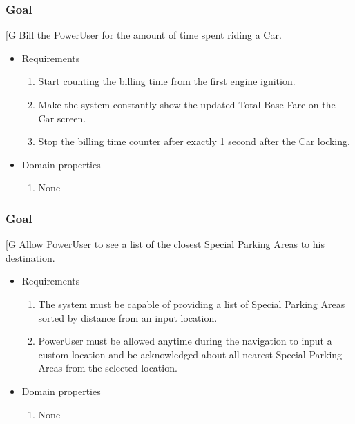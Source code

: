     \subsubsection{Goal }
    {[}G\arabic{goalctr}{]}
	Bill the PowerUser for the amount of time spent riding a Car.
    \begin{itemize}
        \item Requirements
        \begin{enumerate}[REQ]
                \item Start counting the billing time from the first engine ignition.
    	        \item Make the system constantly show the updated Total Base Fare on the Car screen.
    	        \item Stop the billing time counter after exactly 1 second after the Car locking.
        \end{enumerate}
        \item Domain properties
        \begin{enumerate}[PRO]
                \item None
        \end{enumerate}
    \end{itemize}

    \subsubsection{Goal }
    {[}G\arabic{goalctr}{]}
    Allow PowerUser to see a list of the closest Special Parking Areas to his destination.
    \begin{itemize}
        \item Requirements
        \begin{enumerate}[REQ]
    		    \item The system must be capable of providing a list of Special Parking Areas sorted by distance from an input location.
			    \item PowerUser must be allowed anytime during the navigation to input a custom location and be acknowledged about all nearest Special Parking Areas from the selected location.
        \end{enumerate}
        \item Domain properties
        \begin{enumerate}[PRO]
    			\item None
        \end{enumerate}
    \end{itemize}
    
